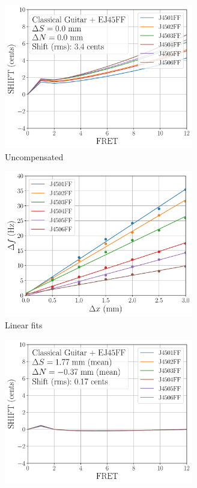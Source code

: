  \begin{figure}
   \centering
   \begin{subfigure}[b]{0.46\textwidth}
    \centering
    \includegraphics[width=3.25in]{figures/shift_classicalguitar_ej45ff_null}
    \caption{Uncompensated}
    \label{fig:shift_classicalguitar_ej45ff_null}
   \end{subfigure}
   \hspace{0.25in}
   \begin{subfigure}[b]{0.46\textwidth}
    \centering
    \includegraphics[width=3.25in]{figures/fit_ej45ff}
    \caption{Linear fits}
    \label{fig:fit_ej45ff}
   \end{subfigure}
   \par\vspace{0.25in}
   \begin{subfigure}[b]{0.46\textwidth}
    \centering
    \includegraphics[width=3.25in]{figures/shift_classicalguitar_ej45ff_full}

\end{subfigure}
\end{figure}
